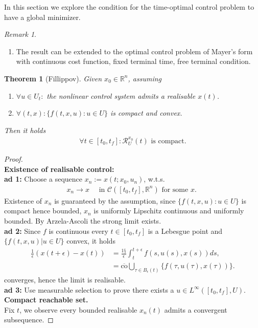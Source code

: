 \documentclass[a4paper,11pt,fleqn]{book}
\newtheorem{theorem}{Theorem}[section]
\theoremstyle{definition}
\theoremstyle{remark}
\newtheorem*{remark}{Remark}
\begin{document}
In this section we explore the condition for the time-optimal control problem to have a global minimizer. 
\begin{remark}
\quad
\begin{enumerate}
	\item The result can be extended to the optimal control problem of Mayer's form with continuous cost function, fixed terminal time, free terminal condition. 
\end{enumerate}
\end{remark}


\begin{theorem}[Fillippov]
	Given $x_0 \in \mathbb{R}^n$, assuming 
	\begin{enumerate}
		\item $\forall u \in U_t:$ the nonlinear control system admits a realisable $x(t)$. 
		\item $\forall (t, x): \bigg\{f(t, x, u): u \in U \bigg\}$ is compact and convex. 
	\end{enumerate}
	Then it holds
	\begin{align*}
		\forall t \in [t_0, t_f]: \mathcal{R}_U^{x_0}(t) \text{ is compact.}
	\end{align*}
\end{theorem}
\begin{proof}
	 \quad\\
	 \textbf{Existence of realisable control:}\\
	 \textbf{ad 1:} Choose a sequence $x_n:= x(t; x_0, u_n)$, w.t.s. 
	 \begin{align*}
	 	x_n \rightarrow x \quad \text{ in } \mathcal{C}([t_0, t_f], \mathbb{R}^n) \text{ for some $x$. }
	 \end{align*} 
	 Existence of $x_n$ is guaranteed by the assumption, since $\{f(t, x, u): u \in U\}$ is compact hence bounded, $x_n$ is uniformly Lipschitz continuous and uniformly bounded. By Arzela-Ascoli the strong limit exists. \\
	 \textbf{ad 2:} Since $f$ is continuous every $t \in [t_0, t_f]$ is a Lebesgue point and $\{ f(t, x, u)|u \in U\}$ convex, it holds
	 \begin{align*}
	 	\frac{1}{\epsilon}(x(t + \epsilon) - x(t)) &= \frac{1§}{\epsilon} \int_t^{t+ \epsilon} f(s, u(s), x(s)) ds, \\
	 	&= \overline{\text{co}} \bigcup_{ \tau \in  B_\epsilon(t)} \{f (\tau, u(\tau), x(\tau)) \}. 
	 \end{align*}
	 converges, hence the limit is realisable.\\
	 \textbf{ad 3:} Use measurable selection to prove there exists a $u \in L^\infty([t_0, t_f], U)$. \\
	 \textbf{Compact reachable set.}\\
	 Fix $t$, we observe every bounded realisable $x_n(t)$ admits a convergent subsequence. 
\end{proof}
\end{document}

